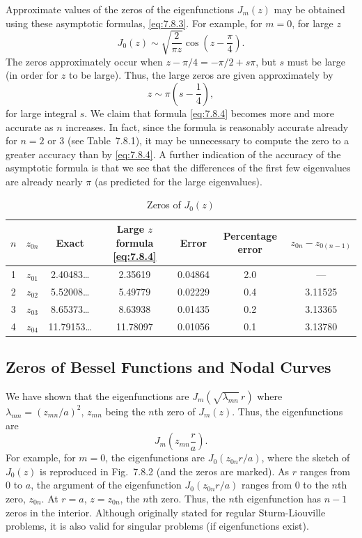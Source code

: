 Approximate values of the zeros of the eigenfunctions $J_m(z)$ may be obtained using these asymptotic formulas, \eqref{eq:7.8.3}.  For example, for $m = 0$, for large $z$
\[
J_0(z) \sim \sqrt{\frac{2}{\pi z}}\cos\left(z - \frac{\pi}{4}\right).
\]
The zeros approximately occur when $z - \pi/4 = -\pi/2 + s\pi$, but $s$ must be large (in order for $z$ to be large).  Thus, the large zeros are given approximately by
\begin{equation}
z \sim \pi\left(s - \frac{1}{4}\right),
\label{eq:7.8.4}
\end{equation}
for large integral $s$.  We claim that formula \eqref{eq:7.8.4} becomes more and more accurate as $n$ increases.  In fact, since the formula is reasonably accurate already for $n = 2$ or 3 (see Table~7.8.1), it may be unnecessary to compute the zero to a greater accuracy than by \eqref{eq:7.8.4}.  A further indication of the accuracy of the asymptotic formula is that we see that the differences of the first few eigenvalues are already nearly $\pi$ (as predicted for the large eigenvalues).

\begin{table}[H]
\centering
\caption{Zeros of $J_0(z)$}
\label{tab:7.8.1}
\begin{tabular}{ccccccc}
\toprule
$n$ & $z_{0n}$ & Exact & Large $z$ formula \eqref{eq:7.8.4} & Error & Percentage error & $z_{0n} - z_{0(n-1)}$ \\
\midrule
1 & $z_{01}$ & 2.40483\ldots & 2.35619 & 0.04864 & 2.0 & --- \\
2 & $z_{02}$ & 5.52008\ldots & 5.49779 & 0.02229 & 0.4 & 3.11525 \\
3 & $z_{03}$ & 8.65373\ldots & 8.63938 & 0.01435 & 0.2 & 3.13365 \\
4 & $z_{04}$ & 11.79153\ldots & 11.78097 & 0.01056 & 0.1 & 3.13780 \\
\bottomrule
\end{tabular}
\end{table}

\subsection{Zeros of Bessel Functions and Nodal Curves}
\label{sec:7.8.3}

We have shown that the eigenfunctions are $J_m\left(\sqrt{\lambda_{mn}}\,r\right)$ where $\lambda_{mn} = (z_{mn}/a)^2$, $z_{mn}$ being the $n$th zero of $J_m(z)$.  Thus, the eigenfunctions are
\[
J_m\left(z_{mn}\frac{r}{a}\right).
\]
For example, for $m = 0$, the eigenfunctions are $J_0(z_{0n}r/a)$, where the sketch of $J_0(z)$ is reproduced in Fig.~7.8.2 (and the zeros are marked).  As $r$ ranges from 0 to $a$, the argument of the eigenfunction $J_0(z_{0n}r/a)$ ranges from 0 to the $n$th zero, $z_{0n}$.  At $r = a$, $z = z_{0n}$, the $n$th zero.  Thus, the $n$th eigenfunction has $n - 1$ zeros in the interior.  Although originally stated for regular Sturm-Liouville problems, it is also valid for singular problems (if eigenfunctions exist).

